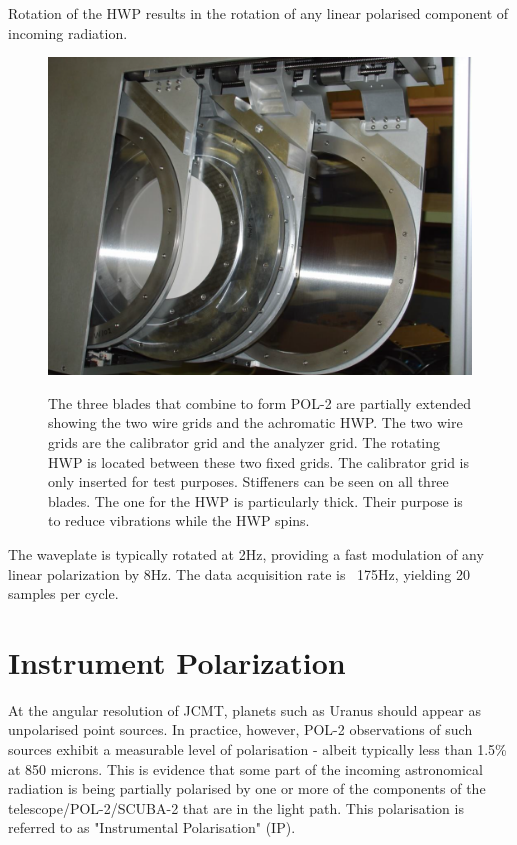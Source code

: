 Rotation of the HWP results in the rotation of any linear polarised component of incoming radiation.



\begin{figure}[t!]
\begin{center}
\includegraphics[width=0.7\linewidth]{pol2-three-components.png}
\label{fig:pol2components}
\caption [POL-2 components]{
  \small The three blades that combine to form POL-2 are partially
  extended showing the two wire grids and the achromatic HWP.
  The two wire grids are the calibrator grid and the analyzer grid.
  The rotating HWP is located between these two fixed grids.
  The calibrator grid is only inserted for test purposes.
  Stiffeners can be seen on all three blades. The one for the HWP
  is particularly thick. Their purpose is to reduce vibrations while
  the HWP spins.
}
\end{center}
\end{figure}

The waveplate is typically rotated at 2Hz, providing a fast modulation of any linear polarization by 8Hz.
The data acquisition rate is ~175Hz, yielding 20 samples per cycle.



\section{Instrument Polarization}

At the angular resolution of JCMT, planets such as Uranus should appear as unpolarised point sources.
In practice, however, POL-2 observations of such sources exhibit a measurable level of polarisation - albeit typically less
than 1.5\% at 850 microns. This is evidence that some part of the incoming astronomical radiation
is being partially polarised by one or more of the components of the telescope/POL-2/SCUBA-2
that are in the light path. This polarisation is referred to as "Instrumental Polarisation" (IP).

